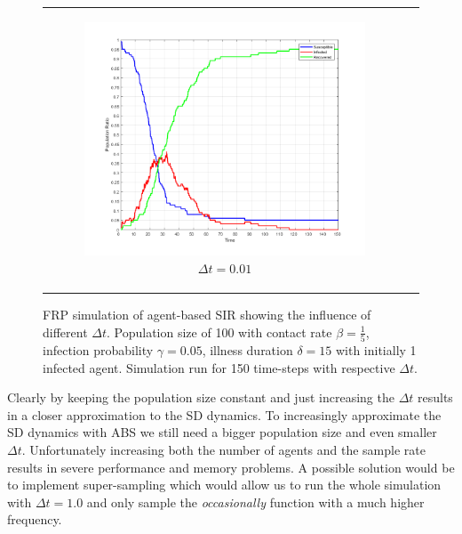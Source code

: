 \begin{figure}
\begin{center}
\begin{tabular}{c c}
		\begin{subfigure}[b]{0.22\textwidth}
			\centering
			\includegraphics[width=1\textwidth, angle=0]{./fig/step2_yampa/SIR_100agents_150t_001dt.png}
			\caption{$\Delta t = 0.01$}
			\label{fig:sir_abs_approximating_001dt_500agents}
		\end{subfigure}
	\end{tabular}
	
	\caption{FRP simulation of agent-based SIR showing the influence of different $\Delta t$. Population size of 100 with contact rate $\beta = \frac{1}{5}$, infection probability $\gamma = 0.05$, illness duration $\delta = 15$ with initially 1 infected agent. Simulation run for 150 time-steps with respective $\Delta t$.} 
	\label{fig:sir_abs_dynamics_frp}
\end{center}
\end{figure}

Clearly by keeping the population size constant and just increasing the $\Delta t$ results in a closer approximation to the SD dynamics. To increasingly approximate the SD dynamics with ABS we still need a bigger population size and even smaller $\Delta t$. Unfortunately increasing both the number of agents and the sample rate results in severe performance and memory problems. A possible solution would be to implement super-sampling which would allow us to run the whole simulation with $\Delta t = 1.0$ and only sample the \textit{occasionally} function with a much higher frequency. 

